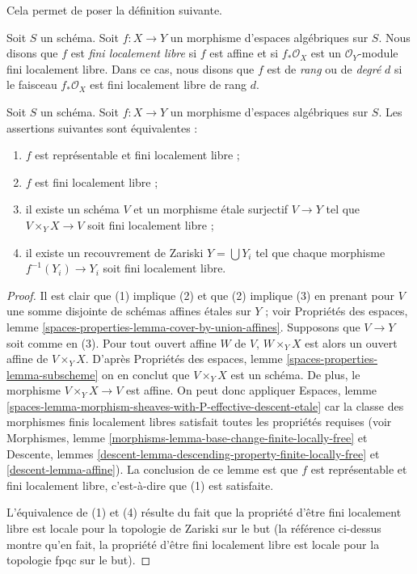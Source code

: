 \noindent
Cela permet de poser la définition suivante.

\begin{definition}
\label{definition-finite-locally-free}
Soit $S$ un schéma.
Soit $f : X \to Y$ un morphisme d'espaces algébriques sur $S$.
Nous disons que $f$ est {\it fini localement libre} si $f$ est affine
et si $f_*\mathcal{O}_X$ est un $\mathcal{O}_Y$-module fini localement libre.
Dans ce cas, nous disons que $f$ est
de {\it rang} ou de {\it degré} $d$
si le faisceau $f_*\mathcal{O}_X$ est fini localement libre de rang $d$.
\end{definition}

\begin{lemma}
\label{lemma-finite-locally-free-local}
Soit $S$ un schéma.
Soit $f : X \to Y$ un morphisme d'espaces algébriques sur $S$.
Les assertions suivantes sont équivalentes :
\begin{enumerate}
\item $f$ est représentable et fini localement libre ;
\item $f$ est fini localement libre ;
\item il existe un schéma $V$ et un morphisme étale surjectif
$V \to Y$ tel que $V \times_Y X \to V$ soit fini localement libre ;
\item il existe un recouvrement de Zariski $Y = \bigcup Y_i$ tel que
chaque morphisme $f^{-1}(Y_i) \to Y_i$ soit fini localement libre.
\end{enumerate}
\end{lemma}

\begin{proof}
Il est clair que (1) implique (2) et que (2) implique (3) en prenant pour
$V$ une somme disjointe de schémas affines étales sur $Y$ ; voir
Propriétés des espaces,
lemme \ref{spaces-properties-lemma-cover-by-union-affines}.
Supposons que $V \to Y$ soit comme en (3). Pour tout ouvert affine $W$ de $V$,
$W \times_Y X$ est alors un ouvert affine de $V \times_Y X$. D'après
Propriétés des espaces, lemme \ref{spaces-properties-lemma-subscheme}
on en conclut que $V \times_Y X$ est un schéma. De plus, le morphisme
$V \times_Y X \to V$ est affine. On peut donc appliquer
Espaces,
lemme \ref{spaces-lemma-morphism-sheaves-with-P-effective-descent-etale}
car la classe des morphismes finis localement libres
satisfait toutes les propriétés requises (voir
Morphismes, lemme \ref{morphisms-lemma-base-change-finite-locally-free}
et Descente, lemmes \ref{descent-lemma-descending-property-finite-locally-free}
et \ref{descent-lemma-affine}).
La conclusion de ce lemme est que $f$ est représentable
et fini localement libre, c'est-à-dire que (1) est satisfaite.

\medskip\noindent
L'équivalence de (1) et (4) résulte du fait que la propriété d'être
fini localement libre est locale pour la topologie de Zariski sur le but (la référence ci-dessus montre
qu'en fait, la propriété d'être fini localement libre est locale pour la topologie fpqc sur le but).
\end{proof}

